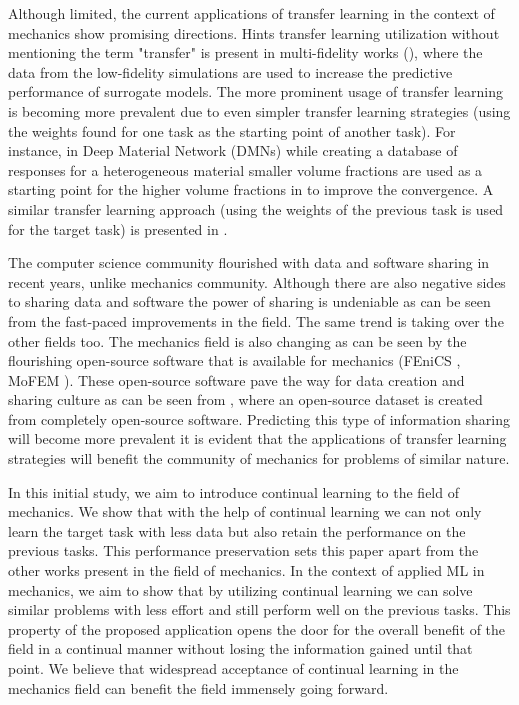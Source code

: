 Although limited, the current applications of transfer learning in the context of mechanics show promising directions. Hints transfer learning utilization without mentioning the term "transfer" is present in multi-fidelity works (\eg \cite{perdikaris2015,perdikaris2017a}), where the data from the low-fidelity simulations are used to increase the predictive performance of surrogate models. The more prominent usage of transfer learning is becoming more prevalent due to even simpler transfer learning strategies (\eg using the weights found for one task as the starting point of another task). For instance, in Deep Material Network (DMNs) while creating a database of responses for a heterogeneous material smaller volume fractions are used as a starting point for the higher volume fractions in \cite{liu2019c} to improve the convergence. A similar transfer learning approach (using the weights of the previous task is used for the target task) is presented in \cite{lejeune2020a}. 

The computer science community flourished with data and software sharing in recent years, unlike mechanics community. Although there are also negative sides to sharing data and software the power of sharing is undeniable as can be seen from the fast-paced improvements in the field. The same trend is taking over the other fields too. The mechanics field is also changing as can be seen by the flourishing open-source software that is available for mechanics (\eg FEniCS \cite{logg2012a}, MoFEM \cite{kaczmarczyk}). These open-source software pave the way for data creation and sharing culture as can be seen from \cite{lejeune2020b}, where an open-source dataset is created from completely open-source software. Predicting this type of information sharing will become more prevalent it is evident that the applications of transfer learning strategies will benefit the community of mechanics for problems of similar nature. 

In this initial study, we aim to introduce continual learning to the field of mechanics. We show that with the help of continual learning we can not only learn the target task with less data but also retain the performance on the previous tasks. This performance preservation sets this paper apart from the other works present in the field of mechanics. In the context of applied ML in mechanics, we aim to show that by utilizing continual learning we can solve similar problems with less effort and still perform well on the previous tasks. This property of the proposed application opens the door for the overall benefit of the field in a continual manner without losing the information gained until that point. We believe that widespread acceptance of continual learning in the mechanics field can benefit the field immensely going forward.

